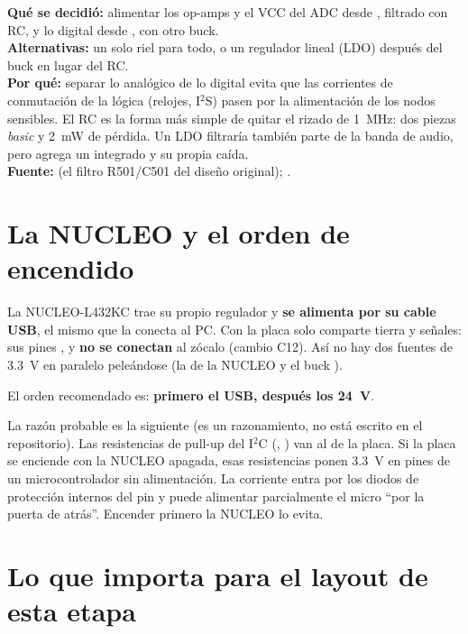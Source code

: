 \begin{decision}
\textbf{Qué se decidió:} alimentar los op-amps y el VCC del ADC desde , filtrado con RC, y lo digital desde , con otro buck.\\
\textbf{Alternativas:} un solo riel para todo, o un regulador lineal (LDO) después del buck en lugar del RC.\\
\textbf{Por qué:} separar lo analógico de lo digital evita que las corrientes de conmutación de la lógica (relojes, I$^2$S) pasen por la alimentación de los nodos sensibles. El RC es la forma más simple de quitar el rizado de \SI{1}{\mega\hertz}: dos piezas \emph{basic} y \SI{2}{\milli\watt} de pérdida. Un LDO filtraría también parte de la banda de audio, pero agrega un integrado y su propia caída.\\
\textbf{Fuente:}  (el filtro R501/C501 del diseño original); .
\end{decision}

\section{La NUCLEO y el orden de encendido}\label{sec:c02-nucleo}

La NUCLEO-L432KC trae su propio regulador y \textbf{se alimenta por su cable USB}, el mismo que la conecta al PC. Con la placa solo comparte tierra y señales: sus pines ,  y  \textbf{no se conectan} al zócalo (cambio C12). Así no hay dos fuentes de \SI{3.3}{\volt} en paralelo peleándose (la de la NUCLEO y el buck ).

El orden recomendado es: \textbf{primero el USB, después los \SI{24}{\volt}}.

\begin{idea}
La razón probable es la siguiente (es un razonamiento, no está escrito en el repositorio). Las resistencias de pull-up del I$^2$C (, ) van al  de la placa. Si la placa se enciende con la NUCLEO apagada, esas resistencias ponen \SI{3.3}{\volt} en pines de un microcontrolador sin alimentación. La corriente entra por los diodos de protección internos del pin y puede alimentar parcialmente el micro ``por la puerta de atrás''. Encender primero la NUCLEO lo evita.
\end{idea}

\section{Lo que importa para el layout de esta etapa}

